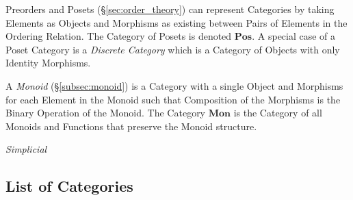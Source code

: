 Preorders and Posets (\S\ref{sec:order_theory}) can represent
Categories by taking Elements as Objects and Morphisms as existing
between Pairs of Elements in the Ordering Relation. The Category of
Posets is denoted $\mathbf{Pos}$. A special case of a Poset Category
is a \emph{Discrete Category} which is a Category of Objects with only
Identity Morphisms.

A \emph{Monoid} (\S\ref{subsec:monoid}) is a Category with a single
Object and Morphisms for each Element in the Monoid such that
Composition of the Morphisms is the Binary Operation of the
Monoid. The Category $\mathbf{Mon}$ is the Category of all Monoids and
Functions that preserve the Monoid structure.

\emph{Simplicial}



\subsection{List of Categories}\label{subsec:categories_list}


